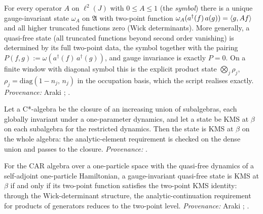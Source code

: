 \begin{fact}\label{fact:quasifree}
For every operator $A$ on $\ell^2(J)$ with $0 \le A \le 1$ (the \emph{symbol}) there is a unique gauge-invariant state $\omega_A$ on $\mathfrak{A}$ with two-point function $\omega_A(a^\dagger(f)\,a(g)) = \langle g, Af\rangle$ and all higher truncated functions zero (Wick determinants). More generally, a quasi-free state (all truncated functions beyond second order vanishing) is determined by its full two-point data, the symbol together with the pairing $P(f, g) := \omega(a^\dagger(f)\,a^\dagger(g))$, and gauge invariance is exactly $P = 0$. On a finite window with diagonal symbol this is the explicit product state $\bigotimes_j \rho_j$, $\rho_j = \mathrm{diag}(1 - n_j,\, n_j)$ in the occupation basis, which the script realises exactly. \emph{Provenance:} Araki \cite{Araki1971}; \cite[\S 5.2]{BratteliRobinson1997}.
\end{fact}

\begin{fact}\label{fact:limitkms}
Let a C*-algebra be the closure of an increasing union of subalgebras, each globally invariant under a one-parameter dynamics, and let a state be KMS at $\beta$ on each subalgebra for the restricted dynamics. Then the state is KMS at $\beta$ on the whole algebra: the analytic-element requirement is checked on the dense union and passes to the closure. \emph{Provenance:} \cite[Prop.~5.3.25]{BratteliRobinson1997}.
\end{fact}

\begin{fact}\label{fact:twopoint}
For the CAR algebra over a one-particle space with the quasi-free dynamics of a self-adjoint one-particle Hamiltonian, a gauge-invariant quasi-free state is KMS at $\beta$ if and only if its two-point function satisfies the two-point KMS identity: through the Wick-determinant structure, the analytic-continuation requirement for products of generators reduces to the two-point level. \emph{Provenance:} Araki \cite{Araki1971}; \cite[\S 5.3]{BratteliRobinson1997}.
\end{fact}

